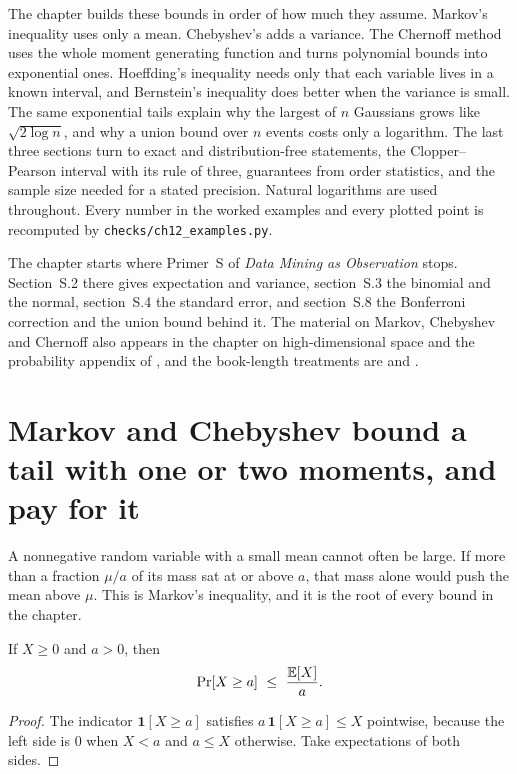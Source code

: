 The chapter builds these bounds in order of how much they assume. Markov's inequality uses only a mean. Chebyshev's adds a variance. The Chernoff method uses the whole moment generating function and turns polynomial bounds into exponential ones. Hoeffding's inequality needs only that each variable lives in a known interval, and Bernstein's inequality does better when the variance is small. The same exponential tails explain why the largest of $n$ Gaussians grows like $\sqrt{2\log n}$, and why a union bound over $n$ events costs only a logarithm. The last three sections turn to exact and distribution-free statements, the Clopper--Pearson interval with its rule of three, guarantees from order statistics, and the sample size needed for a stated precision. Natural logarithms are used throughout. Every number in the worked examples and every plotted point is recomputed by \texttt{checks/ch12\_examples.py}.

The chapter starts where Primer~S of \emph{Data Mining as Observation} stops. Section~S.2 there gives expectation and variance, section~S.3 the binomial and the normal, section~S.4 the standard error, and section~S.8 the Bonferroni correction and the union bound behind it. The material on Markov, Chebyshev and Chernoff also appears in the chapter on high-dimensional space and the probability appendix of \citet{blum2020}, and the book-length treatments are \citet{boucheron2013} and \citet{vershynin2018}.

\section{Markov and Chebyshev bound a tail with one or two moments, and pay for it}\label{sec:ch12:markov}

A nonnegative random variable with a small mean cannot often be large. If more than a fraction $\mu/a$ of its mass sat at or above $a$, that mass alone would push the mean above $\mu$. This is Markov's inequality, and it is the root of every bound in the chapter.

\begin{theorem}[Markov]\label{thm:ch12:markov}
If $X\ge0$ and $a>0$, then
\begin{equation}
\Pr[X\ge a]\ \le\ \frac{\mathbb{E}[X]}{a}.
\label{eq:ch12:markov}
\end{equation}
\end{theorem}
\begin{proof}
The indicator $\mathbf 1[X\ge a]$ satisfies $a\,\mathbf 1[X\ge a]\le X$ pointwise, because the left side is $0$ when $X<a$ and $a\le X$ otherwise. Take expectations of both sides.
\end{proof}

